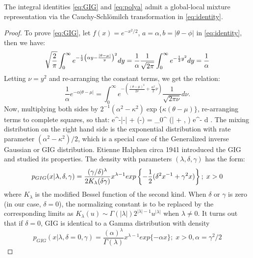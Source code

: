 \documentclass[lineno]{biometrika}
\def\CS{Cauchy-Schl\"omilch }
\begin{document}
\begin{lemma}
The integral identities \eqref{eq:GIG} and \eqref{eq:polya} admit a global-local mixture representation via the \CS transformation in \eqref{eq:identity}. 
\end{lemma}
\begin{proof}
To prove \eqref{eq:GIG}, let $f(x) = e^{-x^2/2}$, $a = \alpha, b = |\theta-\phi|$ in \eqref{eq:identity}, then we have: 
$$
\sqrt{\frac{2}{\pi}} \int_{0}^{\infty} e^{-\frac{1}{2} \left(\alpha y - \frac{|\theta-\mu|}{y} \right)^2} dy = \frac{1}{\alpha}\frac{1}{\sqrt{2\pi}} \int_0^{\infty} e^{-\frac{1}{2} y^2} dy = \frac{1}{\alpha}
$$
Letting $\nu = y^2$ and re-arranging the constant terms, we get the relation:
$$
\frac{1}{\alpha} e^{-\alpha|\theta-\mu|} = \int_{0}^{\infty} e^{-\left( \frac{(\theta-\mu)^2}{2\nu} + \frac{\alpha^2}{2} \nu \right)} \frac{1}{\sqrt{2\pi\nu}} d\nu.
$$
Now, multiplying both sides by $2^{-1}(\alpha^2-\kappa^2) \exp\{\kappa(\theta-\mu)\}$, re-arranging terms to complete squares, so that: 
\beq
{} {\rm e}^{-\alpha|\theta-\mu| + \kappa(\theta-\mu)} = \int_0^{\infty} \phi(\theta | \mu + \kappa \nu, \nu)  e^{- \nu} d \nu.
\eeq
The mixing distribution on the right hand side is the exponential distribution with rate parameter $(\alpha^2-\kappa^2)/2$, which is a special case of the Generalized inverse Gaussian or \mbox{GIG} distribution. Etienne Halphen circa 1941 \citep{seshadri1997halphen} introduced the \mbox{GIG} and \citet{barndorff1977infinite} studied its properties. The density with parameters $(\lambda, \delta, \gamma)$ has the form: 
$$
p_{GIG}(x | \lambda, \delta, \gamma) = \frac{(\gamma/\delta)^{\lambda}}{2K_{\lambda}(\delta \gamma)} x^{\lambda-1} exp \left\{ -\frac{1}{2} (\delta^2 x^{-1} + 
\gamma^2 x )  \right\}; \; x > 0
$$
where $K_{\lambda}$ is the modified Bessel function of the second kind. When $\delta$ or $\gamma$ is zero (in our case, $\delta = 0$), the normalizing constant is to be replaced by the corresponding limits as $K_{\lambda}(u) \sim \Gamma(|\lambda|)2^{|\lambda|-1} u^{|\lambda|}$ when $\lambda \neq 0$. It turns out that if $\delta=0$, GIG is identical to a Gamma distribution with density 
$$
p_{GIG}(x | \lambda, \delta = 0 , \gamma) = \frac{(\alpha)^{\lambda}}{\Gamma(\lambda)} x^{\lambda-1} exp\{ -\alpha x \}; \; x > 0, \alpha = \gamma^2 / 2 
$$
%

\end{proof}
\end{document}
